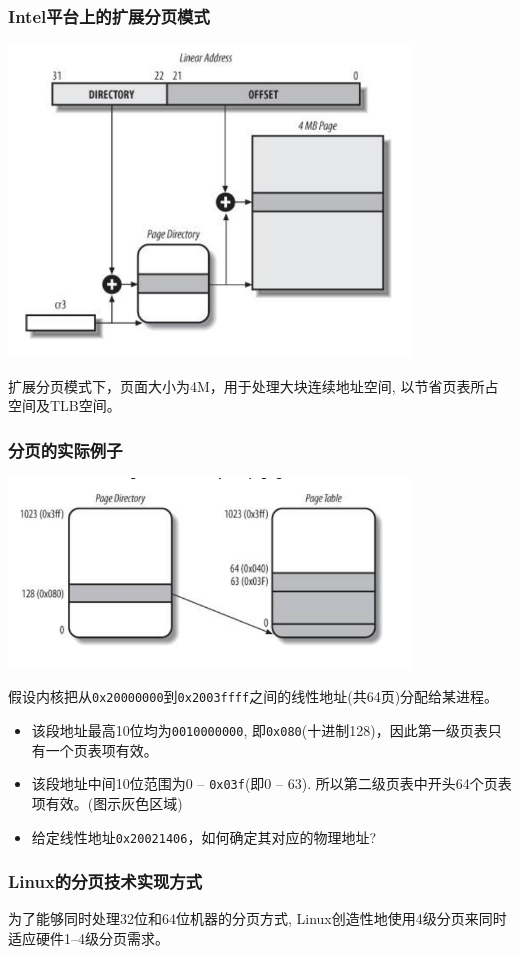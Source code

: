 \documentclass[xcolor=svgnames]{beamer}
\begin{document}
\begin{CJK*}{UTF8}{gbsn}
\begin{frame}[fragile]
\frametitle{Intel平台上的扩展分页模式}
\includegraphics[width=0.8\textwidth]{extpaging.png}

扩展分页模式下，页面大小为4M，用于处理大块连续地址空间,
以节省页表所占空间及TLB空间。
\end{frame}

\begin{frame}[fragile]
\frametitle{分页的实际例子}
\includegraphics[width=0.8\textwidth]{examplepaging.png}

假设内核把从\verb|0x20000000|到\verb|0x2003ffff|之间的线性地址(共64页)分配给某进程。
\begin{itemize}
\item 该段地址最高10位均为\verb|0010000000|, 即\verb|0x080|(十进制128)，因此第一级页表只有一个页表项有效。
\item 该段地址中间10位范围为0 -- \verb|0x03f|(即0 -- 63). 所以第二级页表中开头64个页表项有效。(图示灰色区域)
\item 给定线性地址\verb|0x20021406|，如何确定其对应的物理地址?
\end{itemize}

\end{frame}

\begin{frame}[fragile]
\frametitle{Linux的分页技术实现方式}
为了能够同时处理32位和64位机器的分页方式, Linux创造性地使用4级分页来同时适应硬件1--4级分页需求。


\end{frame}
\end{CJK*}
\end{document}
